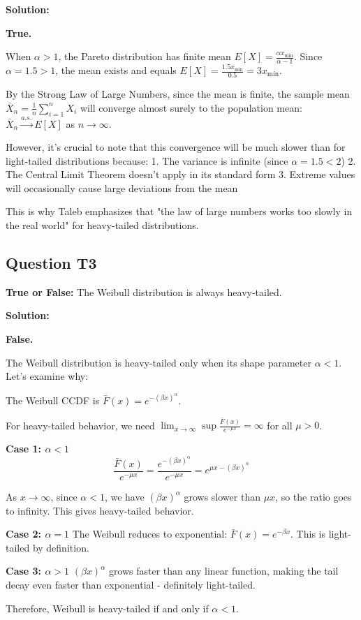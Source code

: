 \documentclass[11pt]{article}
\newenvironment{solution}
{\color{solutioncolor}\begin{framed}\textbf{Solution:}\par}
{\end{framed}}
\begin{document}
\begin{solution}
\textbf{True.}

When $\alpha > 1$, the Pareto distribution has finite mean $E[X] = \frac{\alpha x_{\min}}{\alpha - 1}$. Since $\alpha = 1.5 > 1$, the mean exists and equals $E[X] = \frac{1.5 x_{\min}}{0.5} = 3x_{\min}$.

By the Strong Law of Large Numbers, since the mean is finite, the sample mean $\bar{X}_n = \frac{1}{n}\sum_{i=1}^n X_i$ will converge almost surely to the population mean: $\bar{X}_n \xrightarrow{a.s.} E[X]$ as $n \to \infty$.

However, it's crucial to note that this convergence will be much slower than for light-tailed distributions because:
1. The variance is infinite (since $\alpha = 1.5 < 2$)
2. The Central Limit Theorem doesn't apply in its standard form
3. Extreme values will occasionally cause large deviations from the mean

This is why Taleb emphasizes that "the law of large numbers works too slowly in the real world" for heavy-tailed distributions.
\end{solution}

\subsection{Question T3}
\textbf{True or False:} The Weibull distribution is always heavy-tailed.

\begin{solution}
\textbf{False.}

The Weibull distribution is heavy-tailed only when its shape parameter $\alpha < 1$. Let's examine why:

The Weibull CCDF is $\bar{F}(x) = e^{-(\beta x)^{\alpha}}$.

For heavy-tailed behavior, we need $\lim_{x \to \infty} \sup \frac{\bar{F}(x)}{e^{-\mu x}} = \infty$ for all $\mu > 0$.

\textbf{Case 1: $\alpha < 1$}
$$\frac{\bar{F}(x)}{e^{-\mu x}} = \frac{e^{-(\beta x)^{\alpha}}}{e^{-\mu x}} = e^{\mu x - (\beta x)^{\alpha}}$$

As $x \to \infty$, since $\alpha < 1$, we have $(\beta x)^{\alpha}$ grows slower than $\mu x$, so the ratio goes to infinity. This gives heavy-tailed behavior.

\textbf{Case 2: $\alpha = 1$}
The Weibull reduces to exponential: $\bar{F}(x) = e^{-\beta x}$. This is light-tailed by definition.

\textbf{Case 3: $\alpha > 1$}
$(\beta x)^{\alpha}$ grows faster than any linear function, making the tail decay even faster than exponential - definitely light-tailed.

Therefore, Weibull is heavy-tailed if and only if $\alpha < 1$.
\end{solution}
\end{document}
